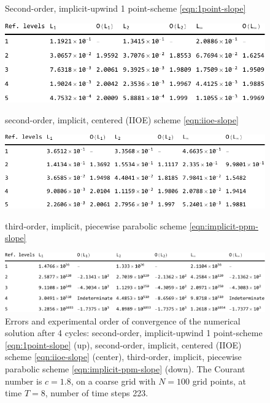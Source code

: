 \documentclass[../thesis.tex]{subfiles}
\begin{document}
\begin{figure}[H]
	\centering
    \caption*{Second-order, implicit-upwind 1 point-scheme \eqref{eqn:1point-slope}}
	\includegraphics[width=\textwidth]{tab-1point-c1p8-T8-limit0-smooth.pdf}
    \caption*{second-order, implicit, centered (IIOE) scheme \eqref{eqn:iioe-slope}}
	\includegraphics[width=\textwidth]{tab-iioe-c1p8-T8-limit0-smooth.pdf}
    \caption*{third-order, implicit, piecewise parabolic scheme \eqref{eqn:implicit-ppm-slope}}
	\includegraphics[width=\textwidth]{tab-implicit-ppm-c1p8-T8-limit0-smooth.pdf}
	\caption{Errors and experimental order of convergence of the numerical solution after 4 cycles: second-order, implicit-upwind 1 point-scheme \eqref{eqn:1point-slope} (up), second-order, implicit, centered (IIOE) scheme \eqref{eqn:iioe-slope} (center), third-order, implicit, piecewise parabolic scheme \eqref{eqn:implicit-ppm-slope} (down). The Courant number is \(c = 1.8\), on a coarse grid with \(N = 100\) grid points, at time \(T = 8\), number of time steps 223.}
	\label{tab:c1p8-T8-limit0-smooth}
\end{figure}
\end{document}
